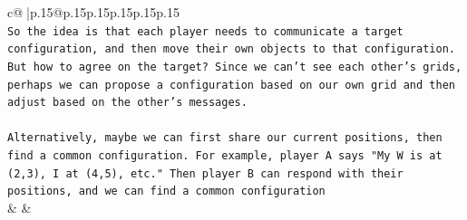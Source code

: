 \documentclass{article}
\begin{document}
{\begin{supertabular}{c@{$\;$}|p{.15\linewidth}@{}p{.15\linewidth}p{.15\linewidth}p{.15\linewidth}p{.15\linewidth}p{.15\linewidth}}
{{{\\ 
\texttt{So the idea is that each player needs to communicate a target configuration, and then move their own objects to that configuration. But how to agree on the target? Since we can't see each other's grids, perhaps we can propose a configuration based on our own grid and then adjust based on the other's messages. } \\
\\ 
\texttt{Alternatively, maybe we can first share our current positions, then find a common configuration. For example, player A says "My W is at (2,3), I at (4,5), etc." Then player B can respond with their positions, and we can find a common configuration} \\
            }
        }
    }
    & & \\ \\


\end{supertabular}}
\end{document}
